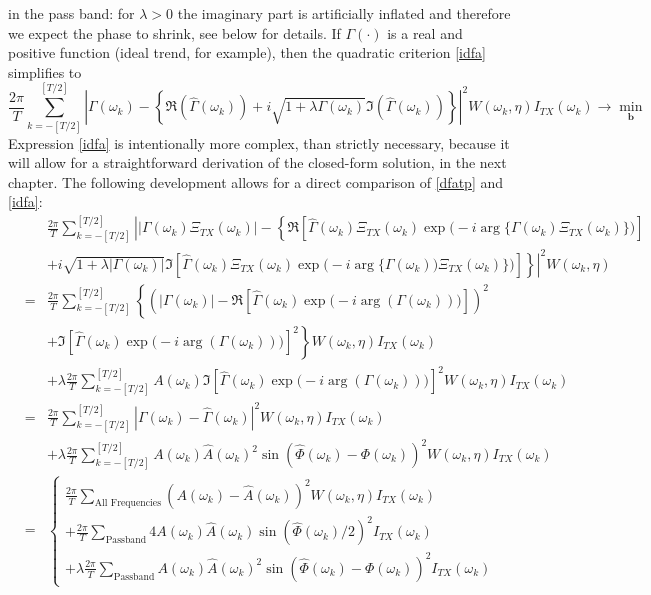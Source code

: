 \documentclass[a4paper]{book}
\begin{document}
in the pass band: for $\lambda>0$ the imaginary part is artificially inflated and therefore we expect the phase 
to shrink, see below for details. If $\Gamma(\cdot)$ is a real and positive function (ideal trend, for example), then the quadratic criterion \ref{idfa} simplifies to
\begin{equation}\label{idfa_s}
\frac{2\pi}{T} \sum_{k=-[T/2]}^{[T/2]}
 \left|\Gamma(\omega_k)-\left\{\Re\left(\hat{\Gamma}(\omega_k)\right)+i\sqrt{1+\lambda\Gamma(\omega_k)}
 \Im\left(\hat{\Gamma}(\omega_k)\right)\right\}\right|^2 W(\omega_k,\eta)I_{TX}(\omega_k)\to\min_{\mathbf{b}}
\end{equation}
Expression \ref{idfa} is intentionally more complex, than strictly necessary, because it will allow for a straightforward derivation of the closed-form solution, in the next chapter. The following development allows for a direct comparison of \ref{dfatp} and \ref{idfa}:
\begin{eqnarray}
&&\frac{2\pi}{T} \sum_{k=-[T/2]}^{[T/2]}
 \left|\big|\Gamma(\omega_k)\Xi_{TX}(\omega_k)\big|-\left\{\Re\left[\hat{\Gamma}(\omega_k)\Xi_{TX}(\omega_k)\exp\big(-i\arg\big\{\Gamma(\omega_k)\Xi_{TX}(\omega_k)\big\}\big)\right]\right.\right.\nonumber\\
 &&\left.\left.+i\sqrt{1+\lambda|\Gamma(\omega_k)|}
 \Im\left[\hat{\Gamma}(\omega_k)\Xi_{TX}(\omega_k)\exp\big(-i\arg\big\{\Gamma(\omega_k))\Xi_{TX}(\omega_k)\big\}\big)\right]\right\}\right|^2 W(\omega_k,\eta)\label{idfa_t}\\
&=&\frac{2\pi}{T} \sum_{k=-[T/2]}^{[T/2]}
  \left\{\left(\big|\Gamma(\omega_k)\big|-\Re\left[\hat{\Gamma}(\omega_k)\exp\big(-i\arg(\Gamma(\omega_k))\big)\right]\right)^2\right.\nonumber\\
&&\left.+\Im\left[\hat{\Gamma}(\omega_k)\exp\big(-i\arg(\Gamma(\omega_k))\big)\right]^2\right\}W(\omega_k,\eta)I_{TX}(\omega_k)\nonumber\\
&&+\lambda\frac{2\pi}{T} \sum_{k=-[T/2]}^{[T/2]}
  A(\omega_k)\Im\left[\hat{\Gamma}(\omega_k)\exp\big(-i\arg(\Gamma(\omega_k))\big)\right]^2W(\omega_k,\eta)I_{TX}(\omega_k) \nonumber\\
&=&\frac{2\pi}{T} \sum_{k=-[T/2]}^{[T/2]}
 \left|\Gamma(\omega_k)-\hat{\Gamma}(\omega_k)\right|^2 W(\omega_k,\eta)I_{TX}(\omega_k)\nonumber\\
&&+\lambda\frac{2\pi}{T} \sum_{k=-[T/2]}^{[T/2]}
  A(\omega_k)\hat{A}(\omega_k)^2\sin\left(\hat{\Phi}(\omega_k)-\Phi(\omega_k)\right)^2W(\omega_k,\eta)I_{TX}(\omega_k)\nonumber\\
&=&\left\{\begin{array}{c}\displaystyle{\frac{2\pi}{T} \sum_{\textrm{All~Frequencies}} (A(\omega_k)-\hat{A}(\omega_k))^2 W(\omega_k,\eta) I_{TX}(\omega_k)}\\
\displaystyle{+\frac{2\pi}{ T}  \sum_{\textrm{Passband}} 4A(\omega_k)\hat{A}(\omega_k)\sin(\hat{\Phi}(\omega_k)/2)^2I_{TX}(\omega_k)}\\
+\displaystyle{\lambda\frac{2\pi}{T} \sum_{\textrm{Passband}}
  A(\omega_k)\hat{A}(\omega_k)^2\sin\left(\hat{\Phi}(\omega_k)-\Phi(\omega_k)\right)^2I_{TX}(\omega_k)}\end{array}\right.\label{idfatp}  
\end{eqnarray}
\end{document}
